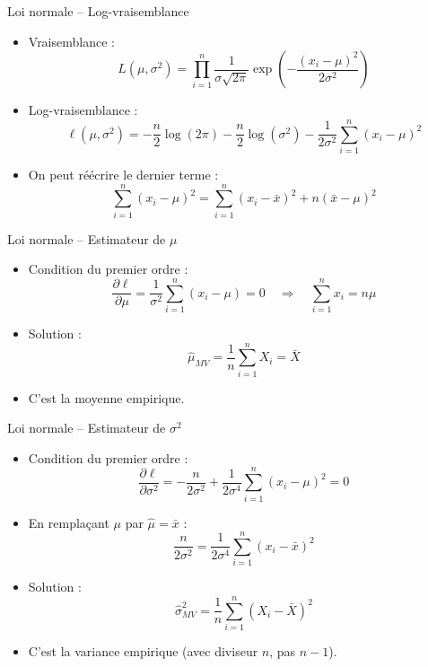 \documentclass[11pt,aspectratio=169]{beamer}
\begin{document}
\begin{frame}{Loi normale -- Log-vraisemblance}

\begin{itemize}

\item Vraisemblance :
  \[
  L(\mu, \sigma^2) = \prod_{i=1}^n \frac{1}{\sigma\sqrt{2\pi}} \exp\left(-\frac{(x_i-\mu)^2}{2\sigma^2}\right)
  \]

\item Log-vraisemblance :
  \[
  \ell(\mu, \sigma^2) = -\frac{n}{2}\log(2\pi) - \frac{n}{2}\log(\sigma^2) - \frac{1}{2\sigma^2}\sum_{i=1}^n (x_i - \mu)^2
  \]

\item On peut réécrire le dernier terme :
  \[
  \sum_{i=1}^n (x_i - \mu)^2 = \sum_{i=1}^n (x_i - \bar{x})^2 + n(\bar{x} - \mu)^2
  \]

\end{itemize}

\end{frame}

\begin{frame}{Loi normale -- Estimateur de $\mu$}

\begin{itemize}

\item Condition du premier ordre :
  \[
  \frac{\partial \ell}{\partial \mu} = \frac{1}{\sigma^2}\sum_{i=1}^n (x_i - \mu) = 0 \quad \Rightarrow \quad \sum_{i=1}^n x_i = n\mu
  \]

\item Solution :
  \[
  \boxed{\hat{\mu}_{MV} = \frac{1}{n}\sum_{i=1}^n X_i = \bar{X}}
  \]

\item C'est la moyenne empirique.

\end{itemize}

\end{frame}

\begin{frame}{Loi normale -- Estimateur de $\sigma^2$}

\begin{itemize}

\item Condition du premier ordre :
  \[
  \frac{\partial \ell}{\partial \sigma^2} = -\frac{n}{2\sigma^2} + \frac{1}{2\sigma^4}\sum_{i=1}^n (x_i - \mu)^2 = 0
  \]

\item En remplaçant $\mu$ par $\hat{\mu} = \bar{x}$ :
  \[
  \frac{n}{2\sigma^2} = \frac{1}{2\sigma^4}\sum_{i=1}^n (x_i - \bar{x})^2
  \]

\item Solution :
  \[
  \boxed{\hat{\sigma}^2_{MV} = \frac{1}{n}\sum_{i=1}^n (X_i - \bar{X})^2}
  \]

\item C'est la variance empirique (avec diviseur $n$, pas $n-1$).

\end{itemize}

\end{frame}
\end{document}
